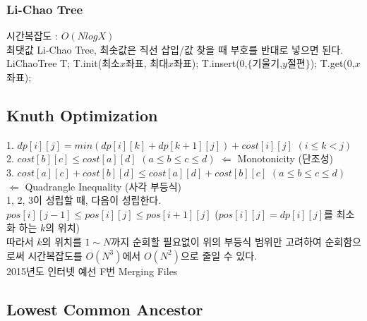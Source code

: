 \documentclass[10pt,landscape,a4paper,twocolumn]{article}
\begin{document}
\subsubsection{Li-Chao Tree}
시간복잡도 : $O(NlogX)$ \\
최댓값 Li-Chao Tree, 최솟값은 직선 삽입/값 찾을 때 부호를 반대로 넣으면 된다. LiChaoTree T; T.init(최소$x$좌표, 최대$x$좌표); T.insert(0,$\{$기울기,$y$절편$\}$); T.get(0,$x$좌표);


\subsection{Knuth Optimization}
1. $dp[i][j]=min(dp[i][k]+dp[k+1][j])+cost[i][j]$ \hspace{1em} $(i\le k < j)$\\
2. $cost[b][c]\le cost[a][d]$ \hspace{1em} $(a\le b\le c\le d)$ \hspace{1em} $\Leftarrow$ Monotonicity (단조성)\\
3. $cost[a][c]+cost[b][d]\le cost[a][d]+cost[b][c]$ \hspace{1em} $(a\le b\le c\le d)$ \hspace{1em} $\Leftarrow$ Quadrangle Inequality (사각 부등식)\\
1, 2, 3이 성립할 때, 다음이 성립한다.\\
$pos[i][j-1]\le pos[i][j]\le pos[i+1][j]$ \hspace{1em} ($pos[i][j]=dp[i][j]$를 최소화 하는 $k$의 위치)\\
따라서 $k$의 위치를 $1\sim N$까지 순회할 필요없이 위의 부등식 범위만 고려하여 순회함으로써 시간복잡도를 $O(N^3)$에서 $O(N^2)$으로 줄일 수 있다.\\
2015년도 인터넷 예선 F번 Merging Files


\subsection{Lowest Common Ancestor}

\end{document}
